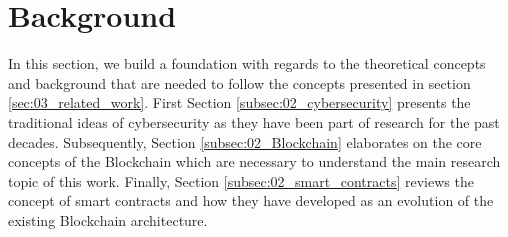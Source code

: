 \section{Background}
\label{sec:02_background}

In this section, we build a foundation with regards to the theoretical concepts and background that are needed to follow the concepts presented in section \ref{sec:03_related_work}. First Section \ref{subsec:02_cybersecurity} presents the traditional ideas of cybersecurity as they have been part of research for the past decades. Subsequently, Section \ref{subsec:02_Blockchain} elaborates on the core concepts of the Blockchain which are necessary to understand the main research topic of this work. Finally, Section \ref{subsec:02_smart_contracts} reviews the concept of smart contracts and how they have developed as an evolution of the existing Blockchain architecture.




